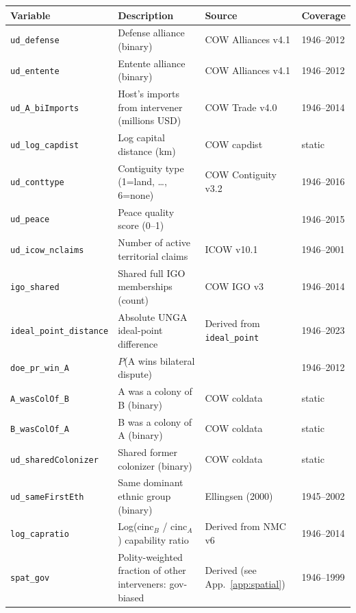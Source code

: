 \begin{table}[p]
  \centering
  \scriptsize
  \begin{tabular}{@{}lp{5cm}ll@{}}
    \toprule
    \textbf{Variable} & \textbf{Description} & \textbf{Source} & \textbf{Coverage} \\
    \midrule
    \texttt{ud\_defense} & Defense alliance (binary) & COW Alliances v4.1 \citep{gibler2009} & 1946--2012 \\
    \texttt{ud\_entente} & Entente alliance (binary) & COW Alliances v4.1 & 1946--2012 \\
    \texttt{ud\_A\_biImports} & Host's imports from intervener (millions USD) & COW Trade v4.0 & 1946--2014 \\
    \texttt{ud\_log\_capdist} & Log capital distance (km) & COW capdist & static \\
    \texttt{ud\_conttype} & Contiguity type (1=land, \ldots, 6=none) & COW Contiguity v3.2 \citep{stinnett2002} & 1946--2016 \\
    \texttt{ud\_peace} & Peace quality score (0--1) & \citet{diehl2019} & 1946--2015 \\
    \texttt{ud\_icow\_nclaims} & Number of active territorial claims & ICOW v10.1 \citep{huth2003} & 1946--2001 \\
    \texttt{igo\_shared} & Shared full IGO memberships (count) & COW IGO v3 \citep{pevehouse2020} & 1946--2014 \\
    \texttt{ideal\_point\_distance} & Absolute UNGA ideal-point difference & Derived from \texttt{ideal\_point} & 1946--2023 \\
    \texttt{doe\_pr\_win\_A} & $P$(A wins bilateral dispute) & \citet{carroll2019} & 1946--2012 \\
    \texttt{A\_wasColOf\_B} & A was a colony of B (binary) & COW coldata & static \\
    \texttt{B\_wasColOf\_A} & B was a colony of A (binary) & COW coldata & static \\
    \texttt{ud\_sharedColonizer} & Shared former colonizer (binary) & COW coldata & static \\
    \texttt{ud\_sameFirstEth} & Same dominant ethnic group (binary) & Ellingsen (2000) & 1945--2002 \\
    \texttt{log\_capratio} & Log(cinc$_B$ / cinc$_A$) capability ratio & Derived from NMC v6 & 1946--2014 \\
    \texttt{spat\_gov} & Polity-weighted fraction of other interveners: gov-biased & Derived (see App.~\ref{app:spatial}) & 1946--1999 \\

\end{tabular}
\end{table}
